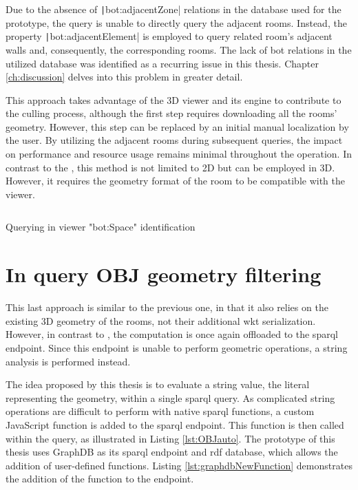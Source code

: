 Due to the absence of \texttt|bot:adjacentZone| relations in the database used for the prototype, the query is unable to directly query the adjacent rooms. Instead, the property \texttt|bot:adjacentElement| is employed to query related room's adjacent walls and, consequently, the corresponding rooms. The lack of \ac{bot} relations in the utilized database was identified as a recurring issue in this thesis. Chapter \ref{ch:discussion} delves into this problem in greater detail.

This approach takes advantage of the 3D viewer and its engine to contribute to the culling process, although the first step requires downloading all the rooms' geometry. However, this step can be replaced by an initial manual localization by the user. By utilizing the adjacent rooms during subsequent queries, the impact on performance and resource usage remains minimal throughout the operation. In contrast to the , this method is not limited to 2D but can be employed in 3D. However, it requires the geometry format of the room to be compatible with the viewer.

\begin{listing}[H]
    \inputminted{sparql}{dynamicQueries/inViewer/query.rq}
    \vspace{-0.7cm}
    \caption{Querying in viewer "bot:Space" identification}
    \label{lst:BOTauto}
\end{listing}

\section{In query OBJ geometry filtering} \label{sec:inQuery}
This last approach is similar to the previous one, in that it also relies on the existing 3D geometry of the rooms, not their additional \ac{wkt} serialization. However, in contrast to , the computation is once again offloaded to the \ac{sparql} endpoint. Since this endpoint is unable to perform geometric operations, a string analysis is performed instead.

The idea proposed by this thesis is to evaluate a string value, the literal representing the geometry, within a single \ac{sparql} query. As complicated string operations are difficult to perform with native \ac{sparql} functions, a custom JavaScript function is added to the \ac{sparql} endpoint. This function is then called within the query, as illustrated in Listing \ref{lst:OBJauto}. The prototype of this thesis uses GraphDB as its \ac{sparql} endpoint and \ac{rdf} database, which allows the addition of user-defined functions. Listing \ref{lst:graphdbNewFunction} demonstrates the addition of the function to the endpoint.


